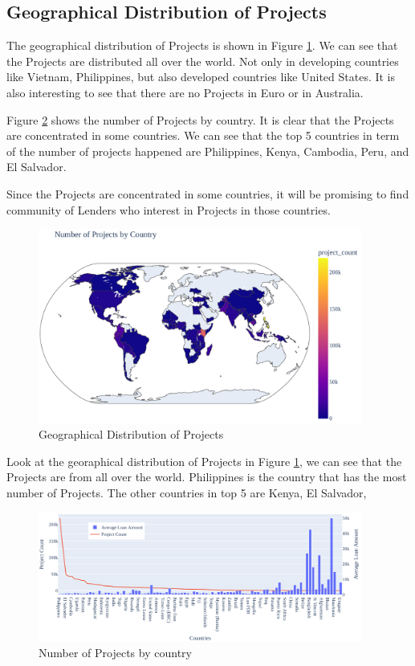 \subsection{Geographical Distribution of Projects}

The geographical distribution of Projects is shown in Figure \ref{fig:map-number-project-by-country}.
We can see that the Projects are distributed all over the world.
Not only in developing countries like Vietnam, Philippines,
but also developed countries like United States.
It is also interesting to see that there are no Projects in Euro or in Australia.

Figure \ref{fig:country-project-distribution} shows the number of Projects by country.
It is clear that the Projects are concentrated in some countries.
We can see that the top 5 countries in term of the number of projects happened are Philippines, Kenya, Cambodia, Peru, and El Salvador.

Since the Projects are concentrated in some countries,
it will be promising to find community of Lenders who interest in Projects in those countries.

\begin{figure}[H]
	\centering
	\includegraphics[width=0.95\textwidth]{images/project-vs-country-map.pdf}
	\caption{Geographical Distribution of Projects}
	\label{fig:map-number-project-by-country}
\end{figure}

Look at the georaphical distribution of Projects in Figure \ref{fig:map-number-project-by-country},
we can see that the Projects are from all over the world.
Philippines is the country that has the most number of Projects.
The other countries in top 5 are Kenya, El Salvador,

\begin{figure}[H]
	\centering
	\includegraphics[width=0.95\textwidth]{images/project-vs-country.pdf}
	\caption{Number of Projects by country}
	\label{fig:country-project-distribution}
\end{figure}



